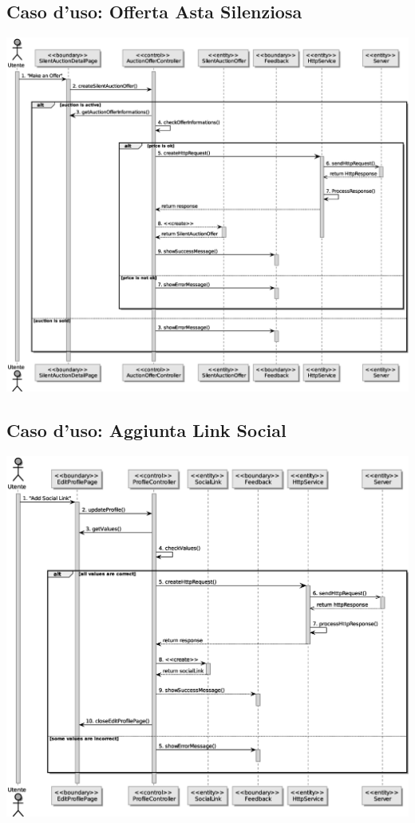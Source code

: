 \subsection{Caso d'uso: Offerta Asta Silenziosa}
\includegraphics[width=\textwidth]{assets/sequence/piazzare_offerta_asta_silenziosa.eps}

\subsection{Caso d'uso: Aggiunta Link Social}
\includegraphics[width=\textwidth]{assets/sequence/aggiungere_link_social.eps}


